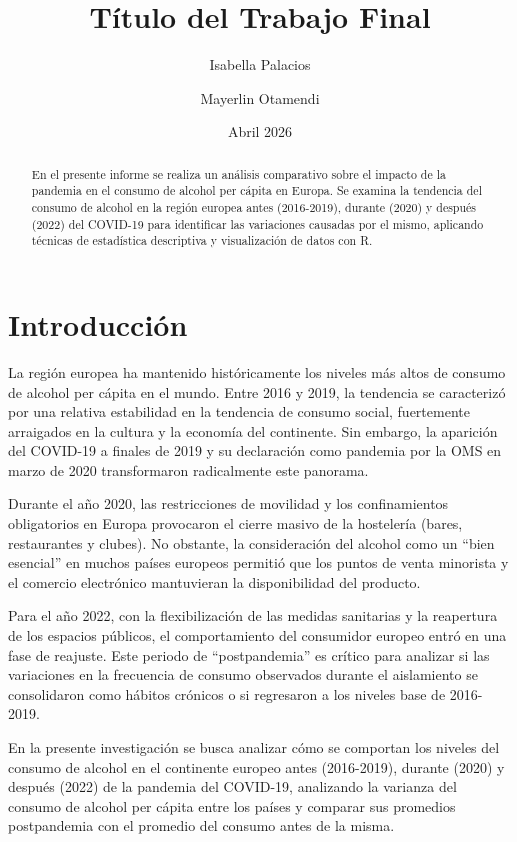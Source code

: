 \documentclass[
]{article}
\title{Título del Trabajo Final}
\author{Isabella Palacios \and Mayerlin Otamendi}
\date{Abril 2026}
\begin{document}
\maketitle
\begin{abstract}
En el presente informe se realiza un análisis comparativo sobre el
impacto de la pandemia en el consumo de alcohol per cápita en Europa. Se
examina la tendencia del consumo de alcohol en la región europea antes
(2016-2019), durante (2020) y después (2022) del COVID-19 para
identificar las variaciones causadas por el mismo, aplicando técnicas de
estadística descriptiva y visualización de datos con R.
\end{abstract}

{
\setcounter{tocdepth}{2}
\tableofcontents
}
\section{Introducción}

La región europea ha mantenido históricamente los niveles más altos de
consumo de alcohol per cápita en el mundo. Entre 2016 y 2019, la
tendencia se caracterizó por una relativa estabilidad en la tendencia de
consumo social, fuertemente arraigados en la cultura y la economía del
continente. Sin embargo, la aparición del COVID-19 a finales de 2019 y
su declaración como pandemia por la OMS en marzo de 2020 transformaron
radicalmente este panorama.

Durante el año 2020, las restricciones de movilidad y los confinamientos
obligatorios en Europa provocaron el cierre masivo de la hostelería
(bares, restaurantes y clubes). No obstante, la consideración del
alcohol como un ``bien esencial'' en muchos países europeos permitió que
los puntos de venta minorista y el comercio electrónico mantuvieran la
disponibilidad del producto.

Para el año 2022, con la flexibilización de las medidas sanitarias y la
reapertura de los espacios públicos, el comportamiento del consumidor
europeo entró en una fase de reajuste. Este periodo de ``postpandemia''
es crítico para analizar si las variaciones en la frecuencia de consumo
observados durante el aislamiento se consolidaron como hábitos crónicos
o si regresaron a los niveles base de 2016-2019.

En la presente investigación se busca analizar cómo se comportan los
niveles del consumo de alcohol en el continente europeo antes
(2016-2019), durante (2020) y después (2022) de la pandemia del
COVID-19, analizando la varianza del consumo de alcohol per cápita entre
los países y comparar sus promedios postpandemia con el promedio del
consumo antes de la misma.
\end{document}
